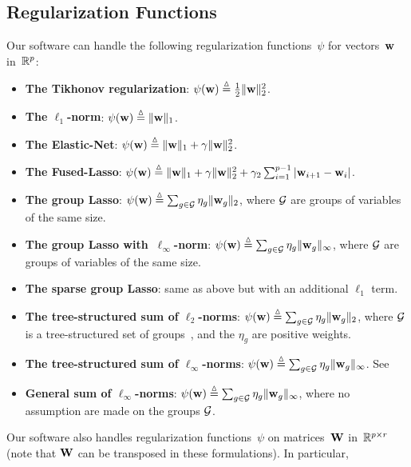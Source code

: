 \documentclass[a4paper, 11pt]{article}
\begin{document}
\subsection{Regularization Functions}
Our software can handle the following regularization functions~$\psi$ for vectors~${\mathbf w}$ in~${\mathbb R}^p$:
\begin{itemize}
\item \textbf{The Tikhonov regularization}: $\psi({\mathbf w}) \stackrel{\vartriangle}{=} \frac{1}{2}\|{\mathbf w}\|_2^2$.
\item \textbf{The $\ell_1$-norm}: $\psi({\mathbf w}) \stackrel{\vartriangle}{=} \|{\mathbf w}\|_1$.
\item \textbf{The Elastic-Net}: $\psi({\mathbf w}) \stackrel{\vartriangle}{=} \|{\mathbf w}\|_1+\gamma\|{\mathbf w}\|_2^2$.
\item \textbf{The Fused-Lasso}: $\psi({\mathbf w}) \stackrel{\vartriangle}{=} \|{\mathbf w}\|_1+\gamma\|{\mathbf w}\|_2^2+\gamma_2\sum_{i=1}^{p-1}|{\mathbf w}_{i+1}-{\mathbf w}_i|$.
\item \textbf{The group Lasso}: $\psi({\mathbf w}) \stackrel{\vartriangle}{=} \sum_{g \in {\mathcal G}} \eta_g \|{\mathbf w}_g\|_2$, where ${\mathcal G}$ are groups of variables of the same size.
\item \textbf{The group Lasso with~$\ell_\infty$-norm}: $\psi({\mathbf w}) \stackrel{\vartriangle}{=} \sum_{g \in {\mathcal G}} \eta_g \|{\mathbf w}_g\|_\infty$, where ${\mathcal G}$ are groups of variables of the same size.
\item \textbf{The sparse group Lasso}: same as above but with an additional $\ell_1$ term.
\item \textbf{The tree-structured sum of $\ell_2$-norms}: $\psi({\mathbf w}) \stackrel{\vartriangle}{=} \sum_{g \in {\mathcal G}} \eta_g \|{\mathbf w}_g\|_2$, where ${\mathcal G}$ is a tree-structured set of groups~\cite{jenatton3}, and the $\eta_g$ are positive weights.
\item \textbf{The tree-structured sum of $\ell_\infty$-norms}: $\psi({\mathbf w}) \stackrel{\vartriangle}{=} \sum_{g \in {\mathcal G}} \eta_g \|{\mathbf w}_g\|_\infty$. See \cite{jenatton3}
\item \textbf{General sum of $\ell_\infty$-norms}:  $\psi({\mathbf w}) \stackrel{\vartriangle}{=} \sum_{g \in {\mathcal G}} \eta_g \|{\mathbf w}_g\|_\infty$, where no assumption are made on the groups ${\mathcal G}$.
\end{itemize}
Our software also handles regularization functions~$\psi$ on matrices~${\mathbf W}$ in~${\mathbb R}^{p \times r}$ (note that ${\mathbf W}$ can be transposed in these formulations). In particular,
\end{document}
